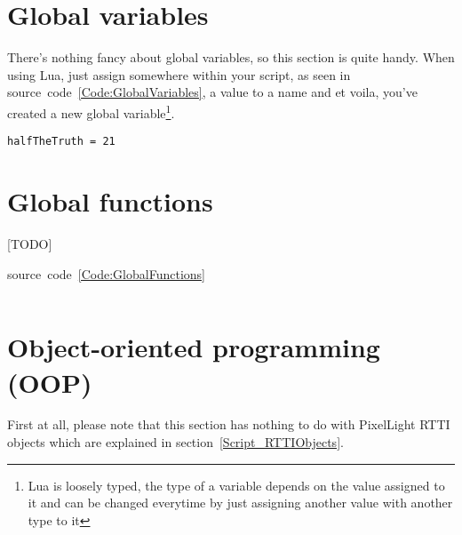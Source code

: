\section{Global variables}
There's nothing fancy about global variables, so this section is quite handy. When using Lua, just assign somewhere within your script, as seen in source~code~\ref{Code:GlobalVariables}, a value to a name and et voila, you've created a new global variable\footnote{Lua is loosely typed, the type of a variable depends on the value assigned to it and can be changed everytime by just assigning another value with another type to it}.
\begin{lstlisting}[float=htb,label=Code:GlobalVariables,caption={Global variables}]
halfTheTruth = 21
\end{lstlisting}




\section{Global functions}
[TODO]



source~code~\ref{Code:GlobalFunctions}
\begin{lstlisting}[float=htb,label=Code:GlobalFunctions,caption={Global functions}]
\end{lstlisting}




\section{Object-oriented programming (OOP)}
First at all, please note that this section has nothing to do with PixelLight RTTI objects which are explained in section~\ref{Script_RTTIObjects}.


